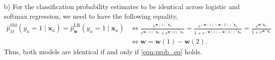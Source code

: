 \documentclass{article}
\renewcommand{\vec}[1]{\mathbf{#1}}
\begin{document}
    b) For the classification probability estimates to be identical across
    logistic and softmax regression, we need to have the following equality,
    \begin{align}
        \hat{p}^{\text{SM}}_{\Omega}(y_n=1\mid\vec{x}_n)=\hat{p}^{\text{LR}}
        _{\vec{w}}(y_n=1\mid\vec{x}_n) &\iff \frac{e^{\vec{w}(1)^\top\vec{x}
        _n}}{e^{\vec{w}(1)^\top\vec{x}_n}+e^{\vec{w}(2)^\top\vec{x}_n}} = 
        \frac{e^{\left(\vec{w}(1)-\vec{w}(2)\right)^\top\vec{x}_n}}{1+e^{\left
        (\vec{w}(1)-\vec{w}(2)\right)^\top\vec{x}_n}} = 
        \frac{e^{\vec{w}^\top\vec{x}_n}}{1+e^{\vec{w}^\top\vec{x}_n}}\\
        \label{eqn:prob_eq}
        &\iff \vec{w} = \vec{w}(1) - \vec{w}(2).
    \end{align}
    Thus, both models are identical if and only if \eqref{eqn:prob_eq} holds.
\end{document}
